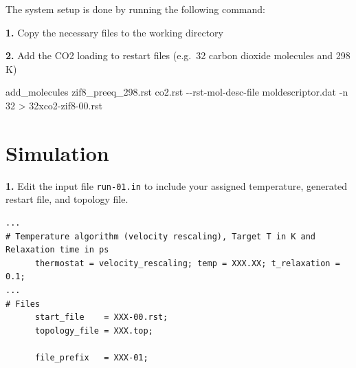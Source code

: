 \documentclass[
  letterpaper,
  DIV=11,
  numbers=noendperiod]{scrreprt}
\newenvironment{Shaded}{\begin{snugshade}}{\end{snugshade}}
\newcommand{\AttributeTok}[1]{\textcolor[rgb]{0.40,0.45,0.13}{#1}}
\newcommand{\ExtensionTok}[1]{\textcolor[rgb]{0.00,0.23,0.31}{#1}}
\newcommand{\FunctionTok}[1]{\textcolor[rgb]{0.28,0.35,0.67}{#1}}
\newcommand{\NormalTok}[1]{\textcolor[rgb]{0.00,0.23,0.31}{#1}}
\newcommand{\OperatorTok}[1]{\textcolor[rgb]{0.37,0.37,0.37}{#1}}
\newcommand{\PreprocessorTok}[1]{\textcolor[rgb]{0.68,0.00,0.00}{#1}}
\newcommand{\VariableTok}[1]{\textcolor[rgb]{0.07,0.07,0.07}{#1}}
\begin{document}

The system setup is done by running the following command:

\textbf{1.} Copy the necessary files to the working directory

\begin{Shaded}
\end{Shaded}

\textbf{2.} Add the CO2 loading to restart files (e.g.~32 carbon dioxide
molecules and 298 K)

\begin{Shaded}
\begin{Highlighting}[]
\ExtensionTok{add\_molecules}\NormalTok{ zif8\_preeq\_298.rst co2.rst }\AttributeTok{{-}{-}rst{-}mol{-}desc{-}file}\NormalTok{ moldescriptor.dat }\AttributeTok{{-}n}\NormalTok{ 32 }\OperatorTok{\textgreater{}}\NormalTok{ 32xco2{-}zif8{-}00.rst}
\end{Highlighting}
\end{Shaded}

\hypertarget{simulation}{%
\section*{Simulation}\label{simulation}}


\textbf{1.} Edit the input file \texttt{run-01.in} to include your
assigned temperature, generated restart file, and topology file.

\begin{verbatim}
...
# Temperature algorithm (velocity rescaling), Target T in K and Relaxation time in ps
      thermostat = velocity_rescaling; temp = XXX.XX; t_relaxation = 0.1;
...
# Files
      start_file    = XXX-00.rst;
      topology_file = XXX.top;

      file_prefix   = XXX-01;
\end{verbatim}
\end{document}
